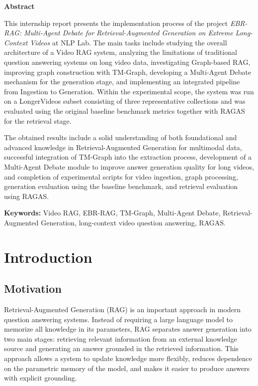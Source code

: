 \documentclass[12pt,a4paper]{article}
\begin{document}
\begin{titlepage}
  \thispagestyle{empty}
  \begin{center}
    {\Large\bfseries Abstract}
  \end{center}

  \vspace{0.8cm}

  This internship report presents the implementation process of the project \textit{EBR-RAG: Multi-Agent Debate for Retrieval-Augmented Generation on Extreme Long-Context Videos} at NLP Lab. The main tasks include studying the overall architecture of a Video RAG system, analyzing the limitations of traditional question answering systems on long video data, investigating Graph-based RAG, improving graph construction with TM-Graph, developing a Multi-Agent Debate mechanism for the generation stage, and implementing an integrated pipeline from Ingestion to Generation. Within the experimental scope, the system was run on a LongerVideos subset consisting of three representative collections and was evaluated using the original baseline benchmark metrics together with RAGAS for the retrieval stage.

  The obtained results include a solid understanding of both foundational and advanced knowledge in Retrieval-Augmented Generation for multimodal data, successful integration of TM-Graph into the extraction process, development of a Multi-Agent Debate module to improve answer generation quality for long videos, and completion of experimental scripts for video ingestion, graph processing, generation evaluation using the baseline benchmark, and retrieval evaluation using RAGAS.

  \vspace{0.5cm}
  \noindent\textbf{Keywords:} Video RAG, EBR-RAG, TM-Graph, Multi-Agent Debate, Retrieval-Augmented Generation, long-context video question answering, RAGAS.
\end{titlepage}

\section{Introduction}

\subsection{Motivation}

Retrieval-Augmented Generation (RAG) is an important approach in modern question answering systems. Instead of requiring a large language model to memorize all knowledge in its parameters, RAG separates answer generation into two main stages: retrieving relevant information from an external knowledge source and generating an answer grounded in the retrieved information. This approach allows a system to update knowledge more flexibly, reduces dependence on the parametric memory of the model, and makes it easier to produce answers with explicit grounding.
\end{document}
